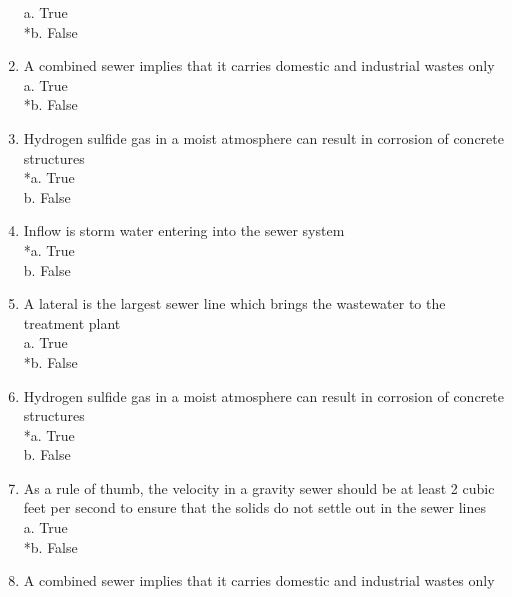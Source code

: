 \begin{enumerate}
a. True \\
*b. False \\

\item  A combined sewer implies that it carries domestic and industrial wastes only \\

a. True \\
*b. False \\

\item  Hydrogen sulfide gas in a moist atmosphere can result in corrosion of concrete structures \\

*a. True \\
b. False \\

\item  Inflow is storm water entering into the sewer system \\

*a. True \\
b. False \\



\item  A lateral is the largest sewer line which brings the wastewater to the treatment plant \\

a. True \\
*b. False \\

\item  Hydrogen sulfide gas in a moist atmosphere can result in corrosion of concrete structures \\

*a. True \\
b. False \\

\item  As a rule of thumb, the velocity in a gravity sewer should be at least 2 cubic feet per second to ensure that the solids do not settle out in the sewer lines\\

a. True \\
*b. False \\

\item  A combined sewer implies that it carries domestic and industrial wastes only \\


\end{enumerate}
